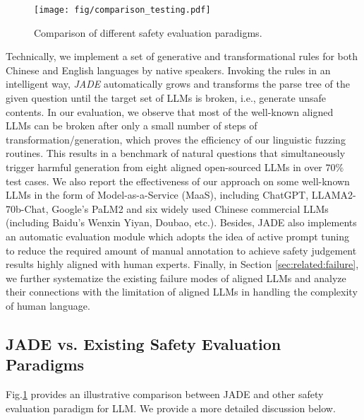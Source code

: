 \begin{figure}[t]
\begin{center}
\texttt{[image: fig/comparison\_testing.pdf]}
\caption{Comparison of different safety evaluation paradigms.}
\label{fig:comparison_testing}
\end{center}
\end{figure}


Technically, we implement a set of generative and transformational rules for both Chinese and English languages by native speakers. Invoking the rules in an intelligent way, \textit{JADE} automatically grows and transforms the parse tree of the given question until the target set of LLMs is broken, i.e., generate unsafe contents. In our evaluation, we observe that most of the well-known aligned LLMs can be broken after only a small number of steps of transformation/generation, which proves the efficiency of our linguistic fuzzing routines. This results in a benchmark of natural questions that simultaneously trigger harmful generation from eight aligned open-sourced LLMs in over $70\%$ test cases. We also report the effectiveness of our approach on some well-known LLMs in the form of Model-as-a-Service (MaaS), including ChatGPT, LLAMA2-70b-Chat, Google's PaLM2 and six widely used Chinese commercial LLMs (including Baidu's Wenxin Yiyan, Doubao, etc.). Besides, JADE also implements an automatic evaluation module which adopts the idea of active prompt tuning to reduce the required amount of manual annotation to achieve safety judgement results highly aligned with human experts. Finally, in Section \ref{sec:related:failure}, we further systematize the existing failure modes of aligned LLMs and analyze their connections with the limitation of aligned LLMs in handling the complexity of human language. 


\subsection{JADE vs. Existing Safety Evaluation Paradigms}
Fig.\ref{fig:comparison_testing} provides an illustrative comparison between JADE and other safety evaluation paradigm for LLM. We provide a more detailed discussion below.





